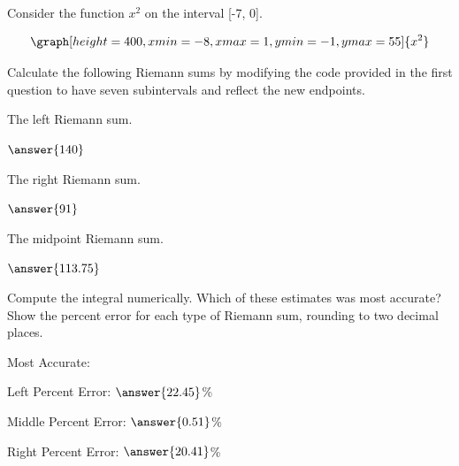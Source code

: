 \documentclass{ximera}
\begin{document}
\begin{question}
Consider the function $x^2$ on the interval [-7, 0].

\[
\graph[height=400,xmin=-8,xmax=1,ymin=-1,ymax=55]{x^2}
\]

Calculate the following Riemann sums by modifying the code provided in the first question to have seven subintervals and reflect the new endpoints.

The left Riemann sum.

\begin{onlineOnly}
\begin{sageCell}

\end{sageCell}
\end{onlineOnly}

$\answer{140}$

The right Riemann sum.

\begin{onlineOnly}
\begin{sageCell}

\end{sageCell}
\end{onlineOnly}

$\answer{91}$

The midpoint Riemann sum.

\begin{onlineOnly}
\begin{sageCell}

\end{sageCell}
\end{onlineOnly}

$\answer{113.75}$

Compute the integral numerically. Which of these estimates was most accurate? Show the percent error for each type of Riemann sum, rounding to two decimal places.

\begin{onlineOnly}
\begin{sageCell}

\end{sageCell}
\end{onlineOnly}

Most Accurate:
\begin{multipleChoice}
\end{multipleChoice}
Left Percent Error: $\answer{22.45}$\%

Middle Percent Error: $\answer{0.51}$\%

Right Percent Error: $\answer{20.41}$\%
\end{question}
\end{document}
